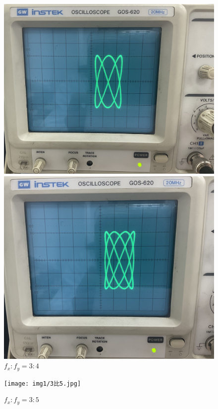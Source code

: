 \documentclass[UTF8]{ctexart}
\begin{document}
\begin{figure}[H]
	\centering
	\begin{minipage}{0.49\linewidth}
		\centering
		\includegraphics[width=0.9\linewidth]{img1/2比3.jpg}
		\caption*{$f_x:f_y=2:3$}
	\end{minipage}
	\begin{minipage}{0.49\linewidth}
		\centering
		\includegraphics[width=0.9\linewidth]{img1/3比4.jpg}
		\caption*{$f_x:f_y=3:4$}
	\end{minipage}
\end{figure}

\begin{figure}[H]
    \centering
    \texttt{[image: img1/3比5.jpg]}
    \caption*{$f_x:f_y=3:5$}
\end{figure}
\end{document}
